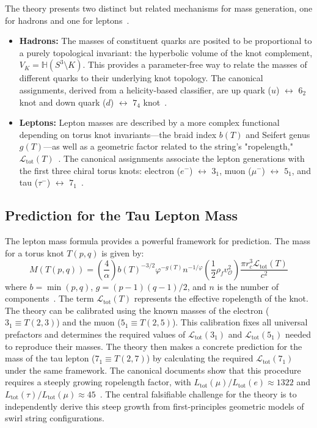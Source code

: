 \documentclass[11pt, a4paper]{article}
\begin{document}
        The theory presents two distinct but related mechanisms for mass generation, one for hadrons and one for leptons~\cite{sst_canon}.
        \begin{itemize}
        \item \textbf{Hadrons:} The masses of constituent quarks are posited to be proportional to a purely topological invariant: the hyperbolic volume of the knot complement, $V_K = \mathbb{H}(S^3 \setminus K)$. This provides a parameter-free way to relate the masses of different quarks to their underlying knot topology. The canonical assignments, derived from a helicity-based classifier, are up quark ($u$) $\leftrightarrow$ $6_2$ knot and down quark ($d$) $\leftrightarrow$ $7_4$ knot~\cite{sst_canon}.
        \item \textbf{Leptons:} Lepton masses are described by a more complex functional depending on torus knot invariants—the braid index $b(T)$ and Seifert genus $g(T)$—as well as a geometric factor related to the string's "ropelength," $\mathcal{L}_{\text{tot}}(T)$~\cite{sst_canon}. The canonical assignments associate the lepton generations with the first three chiral torus knots: electron ($e^-$) $\leftrightarrow$ $3_1$, muon ($\mu^-$) $\leftrightarrow$ $5_1$, and tau ($\tau^-$) $\leftrightarrow$ $7_1$~\cite{sst_canon}.
        \end{itemize}

    \subsection{Prediction for the Tau Lepton Mass}

        The lepton mass formula provides a powerful framework for prediction. The mass for a torus knot $T(p,q)$ is given by:
        \begin{equation}
        M(T(p,q)) = \left(\frac{4}{\alpha}\right)b(T)^{-3/2}\varphi^{-g(T)}n^{-1/\varphi}\left(\frac{1}{2}\rho_{f}v_{\mathcal{O}}^{2}\right)\frac{\pi r_{c}^{3}\mathcal{L}_{\text{tot}}(T)}{c^{2}}
        \end{equation}
        where $b=\min(p,q)$, $g=(p-1)(q-1)/2$, and $n$ is the number of components~\cite{sst_canon}. The term $\mathcal{L}_{\text{tot}}(T)$ represents the effective ropelength of the knot. The theory can be calibrated using the known masses of the electron ($3_1 \equiv T(2,3)$) and the muon ($5_1 \equiv T(2,5)$). This calibration fixes all universal prefactors and determines the required values of $\mathcal{L}_{\text{tot}}(3_1)$ and $\mathcal{L}_{\text{tot}}(5_1)$ needed to reproduce their masses. The theory then makes a concrete prediction for the mass of the tau lepton ($7_1 \equiv T(2,7)$) by calculating the required $\mathcal{L}_{\text{tot}}(7_1)$ under the same framework. The canonical documents show that this procedure requires a steeply growing ropelength factor, with $L_{\text{tot}}(\mu)/L_{\text{tot}}(e) \approx 1322$ and $L_{\text{tot}}(\tau)/L_{\text{tot}}(\mu) \approx 45$~\cite{sst_canon}. The central falsifiable challenge for the theory is to independently derive this steep growth from first-principles geometric models of swirl string configurations.
\end{document}

